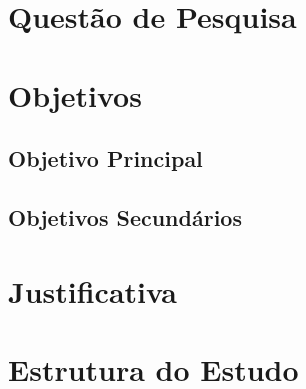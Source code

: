 \section{Questão de Pesquisa}
\lipsum[1]

\section{Objetivos}
\lipsum[1]

\subsection{Objetivo Principal}
\lipsum[1]

\subsection{Objetivos Secundários}
\lipsum[1]

\section{Justificativa}
\lipsum[1]

\section{Estrutura do Estudo}
\lipsum[1]

